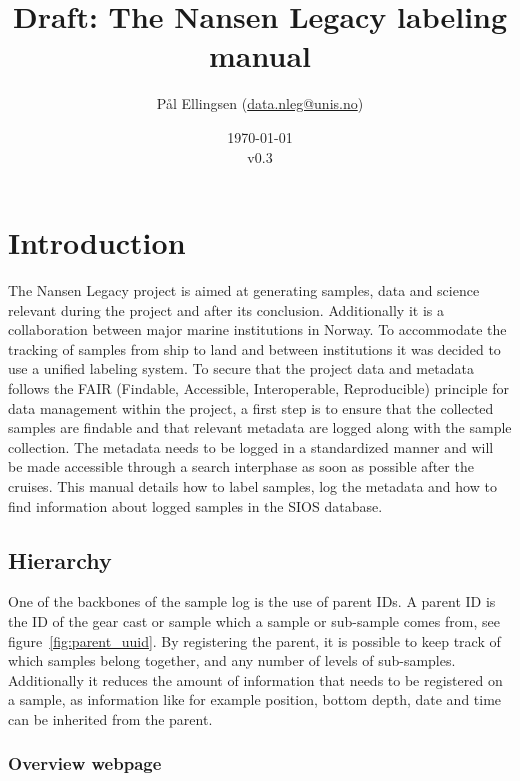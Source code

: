 \documentclass[a4paper,english, 11pt]{article}
\title{Draft: The Nansen Legacy labeling manual}
\date{\today\\v0.3}
\author{Pål Ellingsen (\url{data.nleg@unis.no})}
\begin{document}
\maketitle
\tableofcontents
\pagestyle{fancy}
\newpage
\section{Introduction} %
\label{sec:Introduction}

The Nansen Legacy project is aimed at generating samples, data and science relevant during the project and after its conclusion. Additionally it is a collaboration between major marine institutions in Norway. To accommodate the tracking of samples from ship to land and between institutions it was decided to use a unified labeling system. To secure that the project data and metadata follows the FAIR (Findable, Accessible, Interoperable, Reproducible) principle for data management within the project, a first step is to ensure that the collected samples are findable and that relevant metadata are logged
along with the sample collection. The metadata needs to be logged in a standardized manner and will be
made accessible through a search interphase as soon as possible after the cruises.  This manual details how to label samples, log the metadata and how to find information about logged samples in the SIOS database.  



\subsection{Hierarchy} %
\label{sub:Hirarcy}

One of the backbones of the sample log is the use of parent IDs. A parent ID is the ID of the gear cast or sample which a sample or sub-sample comes from, see figure~\ref{fig:parent_uuid}. By registering the parent, it is possible to keep track of which samples belong together, and any number of levels of sub-samples. Additionally it reduces the amount of information that needs to be registered on a sample, as information like for example position, bottom depth, date and time can be inherited from the parent. 

\subsubsection{Overview webpage} %
\label{ssub:Overview_webpage}
\end{document}
